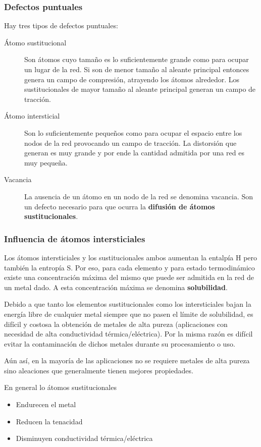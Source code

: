 \subsubsection{Defectos puntuales}
Hay tres tipos de defectos puntuales:

\begin{description}
    \item[Átomo sustitucional] Son átomos cuyo tamaño es lo suficientemente grande como para ocupar un lugar de la red. Si son de menor tamaño al aleante principal entonces genera un campo de compresión, atrayendo los átomos alrededor. Los sustitucionales de mayor tamaño al aleante principal generan un campo de tracción.
    \item[Átomo intersticial] Son lo suficientemente pequeños como para ocupar el espacio entre los nodos de la red provocando un campo de tracción. La distorsión que generan es muy grande y por ende la cantidad admitida por una red es muy pequeña. 
    \item[Vacancia] La ausencia de un átomo en un nodo de la red se denomina vacancia. Son un defecto necesario para que ocurra la \textbf{difusión de átomos sustitucionales}.
\end{description}

\subsubsection{Influencia de átomos intersticiales}
Los átomos intersticiales y los sustitucionales ambos aumentan la entalpía H pero también la entropía S. Por eso, para cada elemento y para estado termodinámico existe una concentración máxima del mismo que puede ser admitida en la red de un metal dado. A esta concentración máxima se denomina \textbf{solubilidad}.


Debido a que tanto los elementos sustitucionales como los intersticiales bajan la energía libre de cualquier metal siempre que no pasen el límite de solubilidad, es difícil y costosa la obtención de metales de alta pureza (aplicaciones con necesidad de alta conductividad térmica/eléctrica). Por la misma razón es difícil evitar la contaminación de dichos metales durante su procesamiento o uso.

Aún así, en la mayoría de las aplicaciones no se requiere metales de alta pureza sino aleaciones que generalmente tienen mejores propiedades. 

En general lo átomos sustitucionales 
\begin{itemize}
    \item Endurecen el metal
    \item Reducen la tenacidad
    \item Disminuyen conductividad térmica/eléctrica
\end{itemize}


